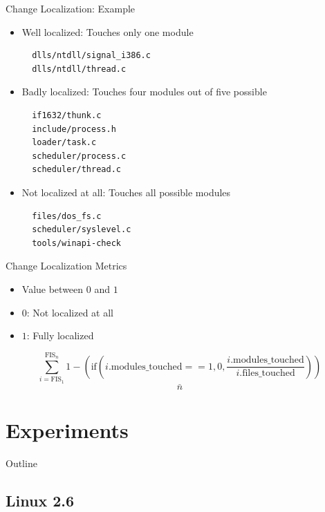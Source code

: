 \begin{frame}[containsverbatim]{Change Localization: Example}
  \begin{itemize}
  \item Well localized: Touches only one module
\begin{verbatim}
  dlls/ntdll/signal_i386.c
  dlls/ntdll/thread.c
\end{verbatim}
  \item Badly localized: Touches four modules out of five possible
\begin{verbatim}
  if1632/thunk.c
  include/process.h
  loader/task.c
  scheduler/process.c
  scheduler/thread.c
\end{verbatim}
  \item Not localized at all: Touches all possible modules
\begin{verbatim}
  files/dos_fs.c
  scheduler/syslevel.c
  tools/winapi-check  
\end{verbatim}
  \end{itemize}
\end{frame}

\note{
}

\begin{frame}{Change Localization Metrics}
  \begin{itemize}
  \item Value between $0$ and $1$
  \item $0$: Not localized at all
  \item $1$: Fully localized
  \end{itemize}


  \[
  \underline{\sum_{i = \text{FIS}_1}^{\text{FIS}_n} 1 -
    \left(\text{if}\left( i.\text{modules\_touched} == 1, 0,
        \frac{i.\text{modules\_touched}}{i.\text{files\_touched}}
      \right) \right)}
  \]
  \[
  n
  \]
\end{frame}

\note{
}


\section{Experiments}

\begin{frame}{Outline}
  \tableofcontents[current]
\end{frame}

\note{
}

\subsection{Linux 2.6}

